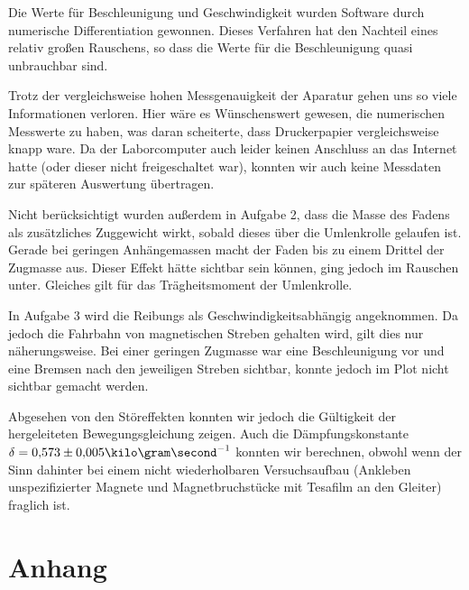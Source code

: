 \documentclass[a4paper,german,12pt,smallheadings]{scrartcl}
\begin{document}
Die Werte für Beschleunigung und Geschwindigkeit wurden Software durch
numerische Differentiation gewonnen. Dieses Verfahren hat den Nachteil eines
relativ großen Rauschens, so dass die Werte für die Beschleunigung quasi
unbrauchbar sind.

Trotz der vergleichsweise hohen Messgenauigkeit der Aparatur gehen uns so viele
Informationen verloren. Hier wäre es Wünschenswert gewesen, die numerischen
Messwerte zu haben, was daran scheiterte, dass Druckerpapier vergleichsweise
knapp ware. Da der Laborcomputer auch leider keinen Anschluss an das Internet
hatte (oder dieser nicht freigeschaltet war), konnten wir auch keine Messdaten
zur späteren Auswertung übertragen.

Nicht berücksichtigt wurden außerdem in Aufgabe 2, dass die Masse des Fadens
als zusätzliches Zuggewicht wirkt, sobald dieses über die Umlenkrolle gelaufen
ist. Gerade bei geringen Anhängemassen macht der Faden bis zu einem Drittel der
Zugmasse aus. Dieser Effekt hätte sichtbar sein können, ging jedoch im Rauschen
unter. Gleiches gilt für das Trägheitsmoment der Umlenkrolle.

In Aufgabe 3 wird die Reibungs als Geschwindigkeitsabhängig angeknommen. Da
jedoch die Fahrbahn von magnetischen Streben gehalten wird, gilt dies nur
näherungsweise. Bei einer geringen Zugmasse war eine Beschleunigung vor und
eine Bremsen nach den jeweiligen Streben sichtbar, konnte jedoch im Plot nicht
sichtbar gemacht werden.

Abgesehen von den Störeffekten konnten wir jedoch die Gültigkeit der
hergeleiteten Bewegungsgleichung zeigen. Auch die Dämpfungskonstante $\delta =
0{,}573\pm0{,}005 \kilo\gram\second^{-1}$ konnten wir berechnen, obwohl wenn
der Sinn dahinter bei einem nicht wiederholbaren Versuchsaufbau (Ankleben
unspezifizierter Magnete und Magnetbruchstücke mit Tesafilm an den Gleiter)
fraglich ist.

\newpage
\begin{landscape}
  
\end{landscape}

\newpage
\begin{landscape}
  
\end{landscape}

\newpage
\section*{Anhang}
\lstset{basicstyle=\footnotesize\ttfamily,breaklines=true}
\lstset{numbers=left, frame=single}
\end{document}

